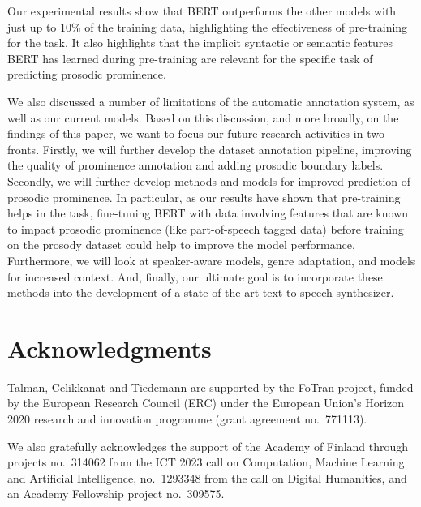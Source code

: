 \documentclass[11pt]{article}
\begin{document}
Our experimental results show that BERT outperforms the other models with just up to 10\% of the training data, highlighting the effectiveness of pre-training for the task. It also highlights that the implicit syntactic or semantic features BERT has learned during pre-training are relevant for the specific task of predicting prosodic prominence.

We also discussed a number of limitations of the automatic annotation system, as well as our current models. Based on this discussion, and more broadly, on the findings of this paper, we want to focus our future research activities in two fronts. Firstly, we will further develop the dataset annotation pipeline, improving the quality of prominence annotation and adding prosodic boundary labels. Secondly, we will further develop methods and models for improved prediction of prosodic prominence. In particular, as our results have shown that pre-training helps in the task, fine-tuning BERT with data involving features that are known to impact prosodic prominence (like part-of-speech tagged data) before training on the prosody dataset could help to improve the model performance. Furthermore, we will look at speaker-aware models, genre adaptation, and models for increased context. And, finally, our ultimate goal is to incorporate these methods into the development of a state-of-the-art text-to-speech synthesizer.

\section*{Acknowledgments}
\vspace{1ex}
\noindent
\begin{minipage}{0.1\linewidth}
\end{minipage}
\hspace{0.01\linewidth}
\begin{minipage}{0.70\linewidth}
Talman, Celikkanat and Tiedemann are supported by the FoTran project, funded by the European Research Council (ERC) under the European Union’s Horizon 2020 research and innovation programme (grant agreement no.~771113). 

 \vspace{1ex}
\end{minipage}
\hspace{0.01\linewidth}
\begin{minipage}{0.05\linewidth}
 \vspace{0.05cm}
\vspace{0.05cm}

\end{minipage}

We also gratefully acknowledges the support of the Academy of Finland through projects no.~314062 from the ICT 2023 call on Computation, Machine Learning and Artificial Intelligence, no.~1293348 from the call on Digital Humanities, and an Academy Fellowship project no.~309575.



\end{document}
